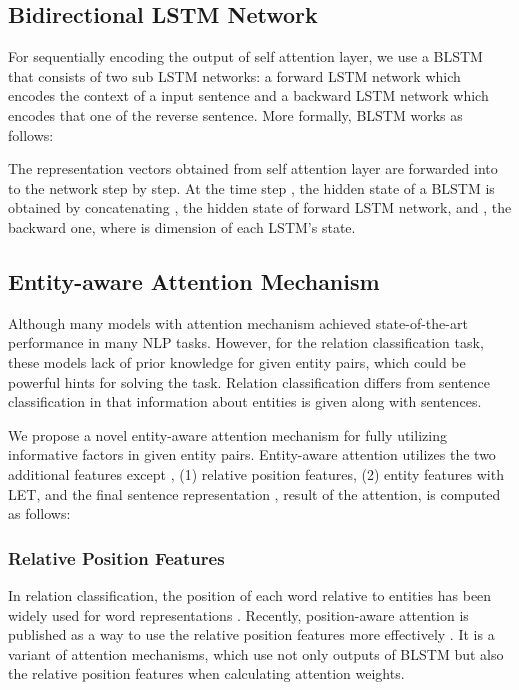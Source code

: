 \documentclass[twoside,leqno,twocolumn]{article}
\begin{document}
\subsection{Bidirectional LSTM Network}
For sequentially encoding the output of self attention layer, we use a BLSTM \cite{graves2005framewise, graves2013speech} that consists of two sub LSTM networks: a forward LSTM network which encodes the context of a input sentence and a backward LSTM network which encodes that one of the reverse sentence.
More formally, BLSTM works as follows:



The representation vectors  obtained from self attention layer are forwarded into to the network step by step. At the time step , the hidden state  of a BLSTM is obtained by concatenating , the hidden state of forward LSTM network, and , the backward one, where  is dimension of each LSTM's state.



\subsection{Entity-aware Attention Mechanism}
Although many models with attention mechanism achieved state-of-the-art performance in many NLP tasks.
However, for the relation classification task, these models lack of prior knowledge for given entity pairs, which could be powerful hints for solving the task.
Relation classification differs from sentence classification in that information about entities is given along with sentences.

We propose a novel entity-aware attention mechanism for fully utilizing informative factors in given entity pairs. Entity-aware attention utilizes the two additional features except , (1) relative position features, (2) entity features with LET, and the final sentence representation , result of the attention, is computed as follows:






\subsubsection{Relative Position Features}
In relation classification, the position of each word relative to entities has been widely used for word representations \cite{zeng2014relation, nguyen2015relation, huang2016attention}.
Recently, position-aware attention is published as a way to use the relative position features more effectively \cite{zhang2017position}.
It is a variant of attention mechanisms, which use not only outputs of BLSTM but also the relative position features when calculating attention weights.
\end{document}
